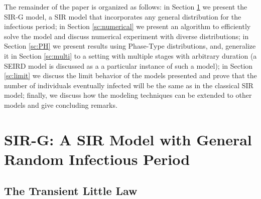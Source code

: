\documentclass[USenglish,10pt]{article}
\begin{document}

The remainder of the paper is organized as follows: in Section \ref{sc:model} we present the SIR-G model, a SIR model that incorporates any general distribution for the infectious period; in Section \ref{sc:numerical} we present an algorithm to efficiently solve the model and discuss numerical experiment with diverse distributions; in Section \ref{sc:PH} we present results using Phase-Type distributions, and, generalize it in Section \ref{sc:multi} to a setting with multiple stages with arbitrary duration (a SEIRD model is discussed as a a particular instance of such a model); in Section \ref{sc:limit} we discuss the limit behavior of the models presented and prove that the number of individuals eventually infected will be the same as in the classical SIR model; finally, we discuss how the modeling techniques can be extended to other models and give concluding remarks.



\section{SIR-G: A SIR Model with General Random Infectious Period}\label{sc:model}



\subsection{The Transient Little Law}
\end{document}
